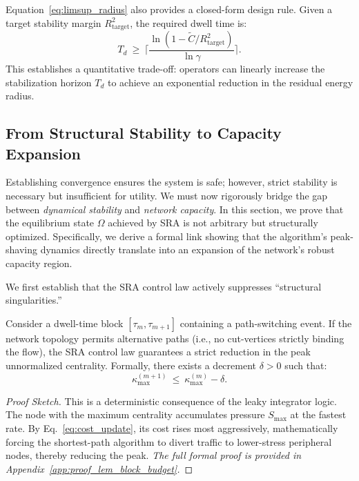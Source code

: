 \documentclass{ccjnl}
\begin{document}
Equation~\eqref{eq:limsup_radius} also provides a closed-form design rule. Given a target stability margin $R_{\text{target}}^2$, the required dwell time is:
\begin{equation}\label{eq:design_parameter_Td}
T_d\ \ge\ \Big\lceil \frac{\ln(1-\tilde C/R_{\text{target}}^2)}{\ln \gamma}\Big\rceil.
\end{equation}
This establishes a quantitative trade-off: operators can linearly increase the stabilization horizon $T_d$ to achieve an exponential reduction in the residual energy radius.

\subsection{From Structural Stability to Capacity Expansion}
\label{subsec:theory_bridge}

Establishing convergence ensures the system is safe; however, strict stability is necessary but insufficient for utility. 
We must now rigorously bridge the gap between \textit{dynamical stability} and \textit{network capacity}.
In this section, we prove that the equilibrium state $\Omega$ achieved by SRA is not arbitrary but structurally optimized.
Specifically, we derive a formal link showing that the algorithm's peak-shaving dynamics directly translate into an expansion of the network's robust capacity region.

We first establish that the SRA control law actively suppresses ``structural singularities.''

\begin{lemma}
\label{lem:block-budget}
Consider a dwell-time block $[\tau_m, \tau_{m+1}]$ containing a path-switching event. 
If the network topology permits alternative paths (i.e., no cut-vertices strictly binding the flow), the SRA control law guarantees a strict reduction in the peak unnormalized centrality. 
Formally, there exists a decrement $\delta > 0$ such that:
\begin{equation}
\kappa^{(m+1)}_{\max}\ \le\ \kappa^{(m)}_{\max} - \delta.
\end{equation}
\end{lemma}
\begin{proof}[Proof Sketch]
This is a deterministic consequence of the leaky integrator logic. The node with the maximum centrality accumulates pressure $S_{\max}$ at the fastest rate. By Eq.~\eqref{eq:cost_update}, its cost rises most aggressively, mathematically forcing the shortest-path algorithm to divert traffic to lower-stress peripheral nodes, thereby reducing the peak. \textit{The full formal proof is provided in Appendix~\ref{app:proof_lem_block_budget}.}
\end{proof}
\end{document}
